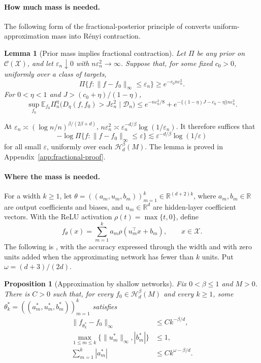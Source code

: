 \documentclass[11pt,a4paper]{article}
\newtheorem{proposition}{Proposition}
\newtheorem{lemma}{Lemma}
\theoremstyle{remark}
\newcommand{\Xcal}{\mathcal X}
\newcommand{\Hcal}{\mathcal H}
\newcommand{\Dcal}{\mathcal D}
\newcommand{\Ccal}{\mathcal C}
\newcommand{\E}{\mathbb E}
\newcommand{\norm}[1]{\lVert#1\rVert}
\begin{document}
\paragraph{How much mass is needed.}
The following form of the fractional-posterior principle of
\citet{bhattacharya2019} converts uniform-approximation mass into
R\'enyi contraction.

\begin{lemma}[Prior mass implies fractional contraction]\label{lem:frac}
Let $\Pi$ be any prior on $\Ccal(\Xcal)$, and let
$\varepsilon_n\downarrow0$ with $n\varepsilon_n^2\to\infty$.
Suppose that, for some fixed $c_0>0$, uniformly over a class of targets,
\[
\Pi\{f:\norm{f-f_0}_\infty\leq\varepsilon_n\}
\geq e^{-c_0n\varepsilon_n^2}.
\]
For $0<\eta<1$ and
$J>(c_0+\eta)/(1-\eta)$,
\begin{equation}\label{eq:frac-general}
\sup_{f_0}\E_{f_0}\Pi_n^\eta
\bigl(D_\eta(f,f_0)>J\varepsilon_n^2\mid\Dcal_n\bigr)
\leq e^{-n\varepsilon_n^2/8}
+e^{-\{(1-\eta)J-c_0-\eta\}n\varepsilon_n^2}.
\end{equation}
\end{lemma}

At $\varepsilon_n\asymp(\log n/n)^{\beta/(2\beta+d)}$,
$n\varepsilon_n^2\asymp
\varepsilon_n^{-d/\beta}\log(1/\varepsilon_n)$.
It therefore suffices that
\[
-\log\Pi\{f:\norm{f-f_0}_\infty\leq\varepsilon\}
\lesssim\varepsilon^{-d/\beta}\log(1/\varepsilon)
\]
for all small $\varepsilon$, uniformly over each $\Hcal_d^\beta(M)$.
The lemma is proved in Appendix~\ref{app:fractional-proof}.

\paragraph{Where the mass is needed.}
For a width $k\geq1$, let
$\theta=((a_m,u_m,b_m))_{m=1}^k\in\mathbb R^{(d+2)k}$, where
$a_m,b_m\in\mathbb R$ are output coefficients and biases, and
$u_m\in\mathbb R^d$ are hidden-layer coefficient vectors.
With the ReLU activation $\rho(t)=\max\{t,0\}$, define
\[
f_\theta(x)=\sum_{m=1}^ka_m\rho(u_m^\top x+b_m),
\qquad x\in\Xcal.
\]
The following is \citet[Cor.~2.4(3)]{yangzhou2025}, with the accuracy
expressed through the width and with zero units added when the
approximating network has fewer than $k$ units. Put
$\omega=(d+3)/(2d)$.

\begin{proposition}[Approximation by shallow networks]
\label{prop:approx}
Fix $0<\beta\leq1$ and $M>0$. There is $C>0$ such that, for every
$f_0\in\Hcal_d^\beta(M)$ and every $k\geq1$, some
$\theta_k^*=((a_m^*,u_m^*,b_m^*))_{m=1}^k$ satisfies
\begin{align}
\norm{f_{\theta_k^*}-f_0}_\infty&\leq Ck^{-\beta/d},
\label{eq:approx-1}\\
\max_{1\leq m\leq k}\{\norm{u_m^*}_\infty,|b_m^*|\}&\leq1,
\label{eq:approx-2}\\
\sum_{m=1}^k|a_m^*|&\leq Ck^{\omega-\beta/d}.
\label{eq:approx-3}
\end{align}
\end{proposition}
\end{document}
